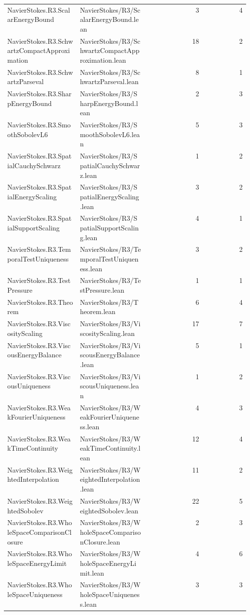 \begin{longtable}{p{0.30\linewidth}p{0.28\linewidth}rr}
NavierStokes.R3.ScalarEnergyBound & NavierStokes/R3/ScalarEnergyBound.lean & 3 & 4\\
NavierStokes.R3.SchwartzCompactApproximation & NavierStokes/R3/SchwartzCompactApproximation.lean & 18 & 2\\
NavierStokes.R3.SchwartzParseval & NavierStokes/R3/SchwartzParseval.lean & 8 & 1\\
NavierStokes.R3.SharpEnergyBound & NavierStokes/R3/SharpEnergyBound.lean & 2 & 3\\
NavierStokes.R3.SmoothSobolevL6 & NavierStokes/R3/SmoothSobolevL6.lean & 5 & 3\\
NavierStokes.R3.SpatialCauchySchwarz & NavierStokes/R3/SpatialCauchySchwarz.lean & 1 & 2\\
NavierStokes.R3.SpatialEnergyScaling & NavierStokes/R3/SpatialEnergyScaling.lean & 3 & 2\\
NavierStokes.R3.SpatialSupportScaling & NavierStokes/R3/SpatialSupportScaling.lean & 4 & 1\\
NavierStokes.R3.TemporalTestUniqueness & NavierStokes/R3/TemporalTestUniqueness.lean & 3 & 2\\
NavierStokes.R3.TestPressure & NavierStokes/R3/TestPressure.lean & 1 & 1\\
NavierStokes.R3.Theorem & NavierStokes/R3/Theorem.lean & 6 & 4\\
NavierStokes.R3.ViscosityScaling & NavierStokes/R3/ViscosityScaling.lean & 17 & 7\\
NavierStokes.R3.ViscousEnergyBalance & NavierStokes/R3/ViscousEnergyBalance.lean & 5 & 1\\
NavierStokes.R3.ViscousUniqueness & NavierStokes/R3/ViscousUniqueness.lean & 1 & 2\\
NavierStokes.R3.WeakFourierUniqueness & NavierStokes/R3/WeakFourierUniqueness.lean & 4 & 3\\
NavierStokes.R3.WeakTimeContinuity & NavierStokes/R3/WeakTimeContinuity.lean & 12 & 4\\
NavierStokes.R3.WeightedInterpolation & NavierStokes/R3/WeightedInterpolation.lean & 11 & 2\\
NavierStokes.R3.WeightedSobolev & NavierStokes/R3/WeightedSobolev.lean & 22 & 5\\
NavierStokes.R3.WholeSpaceComparisonClosure & NavierStokes/R3/WholeSpaceComparisonClosure.lean & 2 & 3\\
NavierStokes.R3.WholeSpaceEnergyLimit & NavierStokes/R3/WholeSpaceEnergyLimit.lean & 4 & 6\\
NavierStokes.R3.WholeSpaceUniqueness & NavierStokes/R3/WholeSpaceUniqueness.lean & 3 & 3\\

\end{longtable}
